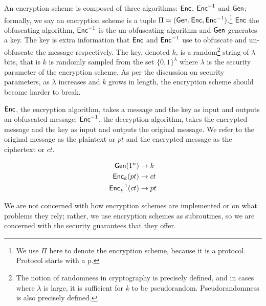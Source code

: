 An encryption scheme is composed of three algorithms: $\textsf{Enc}$, $\textsf{Enc}^{-1}$ and $\textsf{Gen}$; formally, we say an encryption scheme is a tuple $\Pi = (\textsf{Gen}, \textsf{Enc}, \textsf{Enc}^{-1})$.\footnote{We use $\Pi$ here to denote the encryption scheme, because it is a protocol. Protocol starts with a p.}
$\textsf{Enc}$ the obfuscating algorithm, $\textsf{Enc}^{-1}$ is the un-obfuscating algorithm and $\textsf{Gen}$ generates a key. 
The key is extra information that $\textsf{Enc}$ and $\textsf{Enc}^{-1}$ use to obfuscate and un-obfuscate the message respectively. 
The key, denoted $k$, is a random\footnote{The notion of randomness in cryptography is precisely defined, and in cases where $\lambda$ is large, it is sufficient for $k$ to be pseudorandom. Pseudorandomness is also precisely defined.} string of $\lambda$ bits, that is $k$ is randomly sampled from the set $\{0,1\}^{\lambda}$  where $\lambda$ is the security parameter of the encryption scheme. 
As per the discussion on security parameters, as $\lambda$ increases and $k$ grows in length, the encryption scheme should become harder to break.

$\textsf{Enc}$, the encryption algorithm, takes a message and the key as input and outputs an obfuscated message. 
$\textsf{Enc}^{-1}$, the decryption algorithm, takes the encrypted message and the key as input and outputs the original message. 
We refer to the original message as the plaintext or $pt$ and the encrypted message as the ciphertext or $ct$. 

\begin{equation}
    \label{eqn:encryption}
    \begin{split}
    	\textsf{Gen}(1^n) & \rightarrow k \\
        \textsf{Enc}_k (pt) & \rightarrow ct  \\
        \textsf{Enc}^{-1}_k(ct) & \rightarrow pt
    \end{split}
\end{equation}

We are not concerned with how encryption schemes are implemented or on what problems they rely; rather, we use encryption schemes as subroutines, so we are concerned with the security guarantees that they offer.

